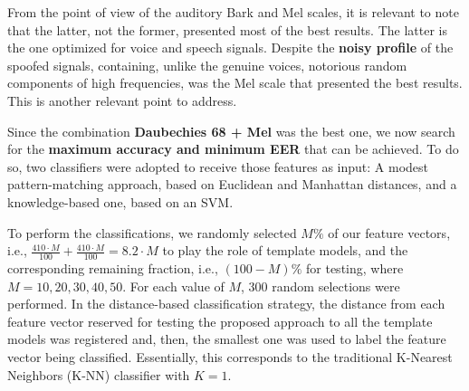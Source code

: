 	\par From the point of view of the auditory Bark and Mel scales, it is relevant to note that the latter, not the former, presented most of the best results. The latter is the one optimized for voice and speech signals. Despite the \textbf{noisy profile} of the spoofed signals, containing, unlike the genuine voices, notorious random components of high frequencies, was the Mel scale that presented the best results. This is another relevant point to address. 
	
	
	
	\par Since the combination \textbf{Daubechies 68 + Mel} was the best one, we now search for the \textbf{maximum accuracy and minimum EER} that can be achieved. To do so, two classifiers were adopted to receive those features as input: A modest pattern-matching approach, based on Euclidean and Manhattan distances, and a knowledge-based one, based on an SVM. 
	\\
	\par To perform the classifications, we randomly selected $M\%$ of our feature vectors, i.e., $\frac{410 \cdot M}{100} + \frac{410 \cdot M}{100} = 8.2 \cdot M$ to play the role of template models, and the corresponding remaining fraction, i.e., $(100-M)\%$ for testing, where $M=10, 20, 30, 40, 50$. For each value of $M$, 300 random selections were performed. In the distance-based classification strategy, the distance from each feature vector reserved for testing the proposed approach to all the template models was registered and, then, the smallest one was used to label the feature vector being classified. Essentially, this corresponds to the traditional K-Nearest Neighbors (K-NN) classifier with $K=1$.     

		
		
